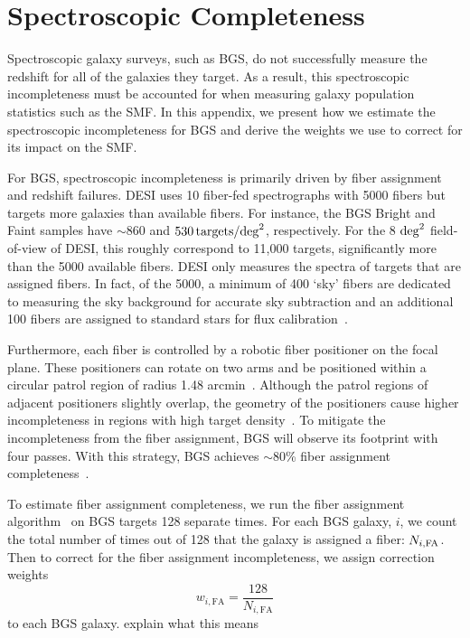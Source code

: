 \section{Spectroscopic Completeness} \label{sec:spec_comp}
Spectroscopic galaxy surveys, such as BGS, do not successfully measure the
redshift for all of the galaxies they target. 
As a result, this spectroscopic incompleteness must be accounted for when
measuring galaxy population statistics such as the SMF.  
In this appendix, we present how we estimate the spectroscopic incompleteness
for BGS and derive the weights we use to correct for its impact on the SMF. 

For BGS, spectroscopic incompleteness is primarily driven by fiber assignment
and redshift failures.  
DESI uses 10 fiber-fed spectrographs with 5000 fibers but targets more galaxies
than available fibers. 
For instance, the BGS Bright and Faint samples have $\sim 860$ and 
$530\,{\rm targets}/{\rm deg}^2$, respectively. 
For the 8 ${\rm deg}^2$ field-of-view of DESI, this roughly correspond to
11,000 targets, significantly more than the 5000 available fibers. 
DESI only measures the spectra of targets that are assigned fibers. 
In fact, of the 5000, a minimum of 400 ‘sky’ fibers are dedicated to measuring
the sky background for accurate sky subtraction and an additional 100 fibers
are assigned to standard stars for flux calibration~\cite{guy2022}.

Furthermore, each fiber is controlled by a robotic fiber positioner on the
focal plane. 
These positioners can rotate on two arms and be positioned within a circular
patrol region of radius 1.48 arcmin~\citep{schubnell2016, desi2016a,2022b, silber2022}.
Although the patrol regions of adjacent positioners slightly overlap, the
geometry of the positioners cause higher incompleteness in regions with high
target density~\citep{smith2019}.
To mitigate the incompleteness from the fiber assignment, BGS will observe its  
footprint with four passes.
With this strategy, BGS achieves $\sim$80\% fiber assignment
completeness~\citep{hahn_bgs}.

To estimate fiber assignment completeness, we run the fiber assignment
algorithm~\citep{raichoor2022} on BGS targets 128 separate times.
For each BGS galaxy, $i$, we count the total number of times out of 128 that
the galaxy is assigned a fiber: $N_{i, {\rm FA}}$. 
Then to correct for the fiber assignment incompleteness, we assign correction
weights
\begin{equation} \label{eq:w_fa}
    w_{i, \mathrm{FA}} = \frac{128}{N_{i, \mathrm{FA}}}
\end{equation}
to each BGS galaxy. 
{\color{red} explain what this means} 

